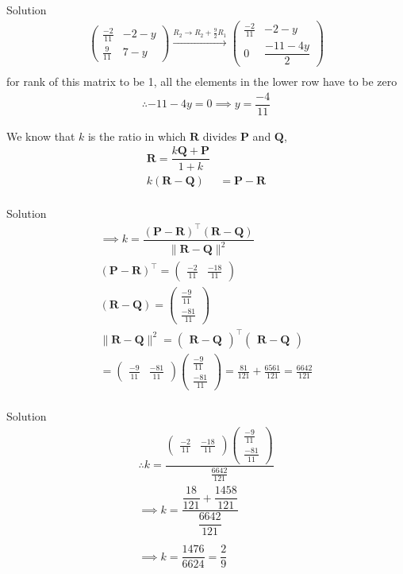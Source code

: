 \documentclass{beamer}
\let\vec\mathbf
\providecommand{\brak}[1]{\ensuremath{\left(#1\right)}}
\theoremstyle{remark}
\providecommand{\norm}[1]{\lVert#1\rVert}
\newcommand{\myvec}[1]{\ensuremath{\begin{pmatrix}#1\end{pmatrix}}}
\begin{document}
\begin{frame}{Solution}
\begin{align*}
 \myvec{\frac{-2}{11} & -2-y \\ \frac{9}{11} & 7-y}\overset{R_2 \rightarrow R_2 + \frac{9}{2}R_1}{\longrightarrow} \myvec{\frac{-2}{11} & -2-y \\ 0 & \dfrac{-11-4y}{2}}\\
 \end{align*}
for rank of this matrix to be 1, all the elements in the lower row have to be zero
\begin{align*}
    \therefore -11-4y=0 \implies
    y=\dfrac{-4}{11}  
\end{align*}

We know that $k$ is the ratio in which $\vec{R}$ divides $\vec{P}$ and $\vec{Q}$,
\begin{align*}
    \vec{R}=\dfrac{k\vec{Q}+\vec{P}}{1+k}\\
   k\brak{\vec{R}-\vec{Q}}&= \vec{P}-\vec{R}\\
\end{align*}
\end{frame}

\begin{frame}{Solution}
   \begin{align*}
    \implies k =\dfrac{\brak{\vec{P}-\vec{R}}^{\top}\brak{\vec{R}-\vec{Q}}}{\norm{\vec{R}-\vec{Q}}^2}\\
   \brak{\vec{P}-\vec{R}}^{\top}=\myvec{\frac{-2}{11} & \frac{-18}{11}}\\
   \brak{\vec{R}-\vec{Q}}=\myvec{\frac{-9}{11} \\ \frac{-81}{11}}\\
   \norm{\vec{R}-\vec{Q}}^2=\myvec{\vec{R}-\vec{Q}}^{\top} \myvec{\vec{R}-\vec{Q}}\\=\myvec{\frac{-9}{11} & \frac{-81}{11}}\myvec{\frac{-9}{11} \\ \frac{-81}{11}}=\frac{81}{121} + \frac{6561}{121}=\frac{6642}{121}\\
   \end{align*}


\end{frame}
\begin{frame}{Solution}
    \begin{align*}
     \therefore k=\dfrac{\myvec{\frac{-2}{11} & \frac{-18}{11}}\myvec{\frac{-9}{11} \\ \frac{-81}{11}}}{\frac{6642}{121}}\\
        \implies k=\dfrac{\dfrac{18}{121} + \dfrac{1458}{121}}{\dfrac{6642}{121}}\\ \\ 
   \implies k=\dfrac{1476}{6624}=\dfrac{2}{9}
    \end{align*}
\end{frame}
\end{document}
